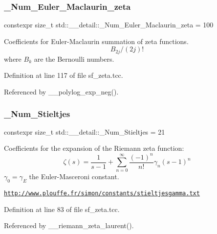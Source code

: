 \subsubsection{\texorpdfstring{\+\_\+\+Num\+\_\+\+Euler\+\_\+\+Maclaurin\+\_\+zeta}{\_Num\_Euler\_Maclaurin\_zeta}}
{\footnotesize\ttfamily constexpr size\+\_\+t std\+::\+\_\+\+\_\+detail\+::\+\_\+\+Num\+\_\+\+Euler\+\_\+\+Maclaurin\+\_\+zeta = 100}

Coefficients for Euler-\/\+Maclaurin summation of zeta functions. \[ B_{2j} / (2j)! \] where $ B_k $ are the Bernoulli numbers. 

Definition at line 117 of file sf\+\_\+zeta.\+tcc.



Referenced by \+\_\+\+\_\+polylog\+\_\+exp\+\_\+neg().

\mbox{\label{namespacestd_1_1____detail_a20c3b4334b0ffa9a5da21768d7830894}} 
\subsubsection{\texorpdfstring{\+\_\+\+Num\+\_\+\+Stieltjes}{\_Num\_Stieltjes}}
{\footnotesize\ttfamily constexpr size\+\_\+t std\+::\+\_\+\+\_\+detail\+::\+\_\+\+Num\+\_\+\+Stieltjes = 21}

Coefficients for the expansion of the Riemann zeta function\+: \[ \zeta(s) = \frac{1}{s-1} + \sum_{n=0}^{\infty}\frac{(-1)^n}{n!}\gamma_n(s-1)^n \] $ \gamma_0 = \gamma_E $ the Euler-\/\+Masceroni constant.

\href{http://www.plouffe.fr/simon/constants/stieltjesgamma.txt}{\tt http\+://www.\+plouffe.\+fr/simon/constants/stieltjesgamma.\+txt} 

Definition at line 83 of file sf\+\_\+zeta.\+tcc.



Referenced by \+\_\+\+\_\+riemann\+\_\+zeta\+\_\+laurent().

\mbox{\label{namespacestd_1_1____detail_a6d1131fefdb30b2746c76ff801bdc833}} 
